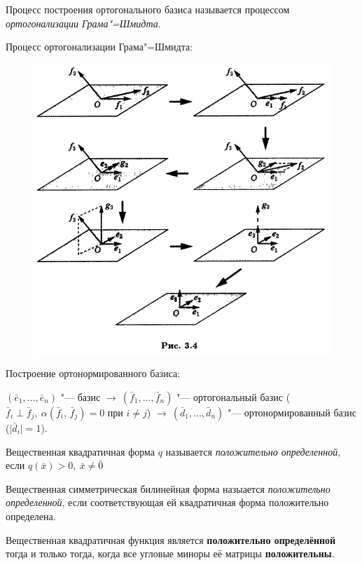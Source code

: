 \begin{definition}
  Процесс построения ортогонального базиса называется процессом \textit{ортогонализации Грама"=Шмидта}.
\end{definition}
\begin{example}
  Процесс ортогонализации Грама"=Шмидта:
  \begin{figure}[H]
    \centering
    \includegraphics[width= \textwidth]{images/map_form_gram-shmidt.png}
  \end{figure}
\end{example}
Построение ортонормированного базиса:

$(\bar{e}_1, \ldots, \bar{e}_n)$ "--- базис $\rightarrow ~ (\bar{f}_1, \ldots, \bar{f}_n)$ "--- ортогональный базис ($\bar{f}_i \; \bot \; \bar{f}_j, ~ \alpha(\bar{f}_i, \, \bar{f}_j) = 0$ при $i \neq j$) $\rightarrow ~ (\bar{d}_1, \ldots, \bar{d}_n)$ "--- ортонормированный базис ($\mathopen| \bar{d}_i \mathclose| = 1$).

\begin{definition}
  Вещественная квадратичная форма $q$ называется \textit{положительно определенной}, если $q(\bar{x}) > 0,~ \bar{x} \neq \bar{0}$

  Вещественная симметрическая билинейная форма назыается \textit{положительно определенной}, если соответствующая ей квадратичная форма положительно определена.
\end{definition}
\begin{theorem}
  Вещественная квадратичная функция является \textbf{положительно определённой} тогда и только тогда, когда все угловые миноры её матрицы \textbf{положительны}.
\end{theorem}
